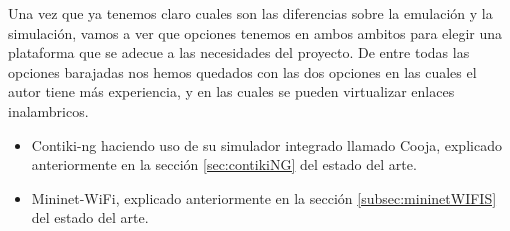 Una vez que ya tenemos claro cuales son las diferencias sobre la emulación y la simulación, vamos a ver que opciones tenemos en ambos ambitos para elegir una plataforma que se adecue a las necesidades del proyecto. De entre todas las opciones barajadas nos hemos quedados con las dos opciones en las cuales el autor tiene más experiencia, y en las cuales se pueden virtualizar enlaces inalambricos.

\begin{itemize}
    \item Contiki-ng haciendo uso de su simulador integrado llamado Cooja, explicado anteriormente en la sección \ref{sec:contikiNG} del estado del arte.

    \item Mininet-WiFi, explicado anteriormente en la sección \ref{subsec:mininetWIFIS} del estado del arte.
\end{itemize}